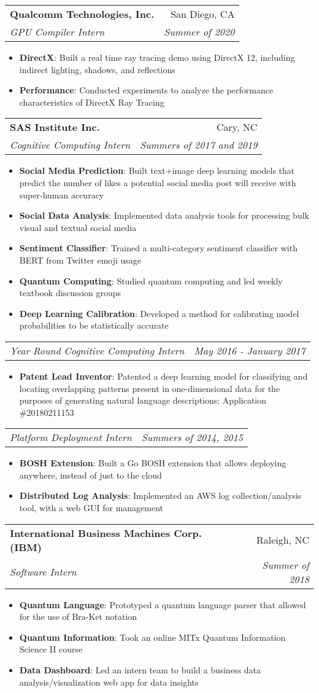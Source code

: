 \documentclass[letterpaper,11pt]{article}
\makeatletter
\newcommand{\resumeItem}[2]{
  \item\small{
    \textbf{#1}{: #2 \vspace{-2pt}}
  }
}
\newcommand{\resumeSubheading}[4]{
  \vspace{-1pt}\item
    \begin{tabular*}{0.97\textwidth}{l@{\extracolsep{\fill}}r}
      \textbf{#1} & #2 \\
      \textit{\small#3} & \textit{\small #4} \\
    \end{tabular*}\vspace{-5pt}
}
\newcommand{\resumeSubheadingPartial}[2]{
  \vspace{-1pt}
    \begin{tabular*}{0.97\textwidth}{l@{\extracolsep{\fill}}r}
      \textit{\small#1} & \textit{\small #2} \\
    \end{tabular*}\vspace{-5pt}
}
\newcommand{\resumeItemListStart}{\begin{itemize}}
\newcommand{\resumeItemListEnd}{\end{itemize}\vspace{-5pt}}
\makeatother
\begin{document}
\resumeSubheading
{Qualcomm Technologies, Inc.}{San Diego, CA}
{GPU Compiler Intern}{Summer of 2020}
\resumeItemListStart
\resumeItem{DirectX}
{Built a real time ray tracing demo using DirectX 12, including indirect lighting, shadows, and reflections}
\resumeItem{Performance}
{Conducted experiments to analyze the performance characteristics of DirectX Ray Tracing}
\resumeItemListEnd

\resumeSubheading
{SAS Institute Inc.}{Cary, NC}
{Cognitive Computing Intern}{Summers of 2017 and 2019}
\resumeItemListStart
\resumeItem{Social Media Prediction}
{Built text+image deep learning models that predict the number of likes a potential social media post will receive with super-human accuracy}
\resumeItem{Social Data Analysis}{Implemented data analysis tools for processing bulk visual and textual social media}
\resumeItem{Sentiment Classifier}{Trained a multi-category sentiment classifier with BERT from Twitter emoji usage}
\resumeItem{Quantum Computing}{Studied quantum computing and led weekly textbook discussion groups}
\resumeItem{Deep Learning Calibration}{Developed a method for calibrating model probabilities to be statistically accurate}
\resumeItemListEnd
\resumeSubheadingPartial{Year Round Cognitive Computing Intern}{May 2016 - January 2017}
\resumeItemListStart
\resumeItem{Patent Lead Inventor}{Patented a deep learning model for classifying and locating overlapping patterns present in one-dimensional data for the purposes of generating natural language descriptions; Application \#20180211153}
\resumeItemListEnd
\resumeSubheadingPartial{Platform Deployment Intern}{Summers of 2014, 2015}
\resumeItemListStart
\resumeItem{BOSH Extension}{Built a Go BOSH extension that allows deploying anywhere, instead of just to the cloud}
\resumeItem{Distributed Log Analysis}{Implemented an AWS log collection/analysis tool, with a web GUI for management}
\resumeItemListEnd

\resumeSubheading
{International Business Machines Corp. (IBM)}{Raleigh, NC}
{Software Intern}{Summer of 2018}
\resumeItemListStart
\resumeItem{Quantum Language}
{Prototyped a quantum language parser that allowed for the use of Bra-Ket notation}
\resumeItem{Quantum Information}
{Took an online MITx Quantum Information Science II course}
\resumeItem{Data Dashboard}
{Led an intern team to build a business data analysis/visualization web app for data insights}
\resumeItemListEnd

\end{document}
